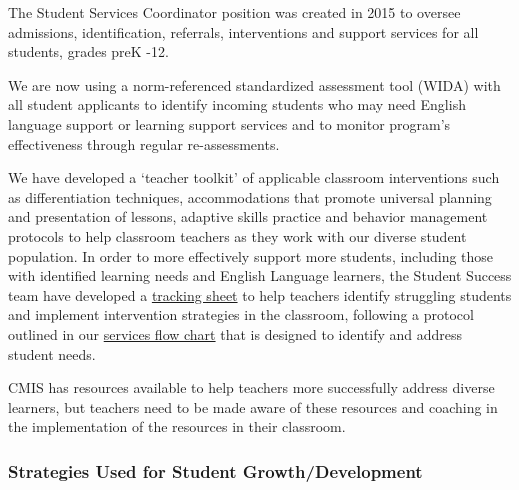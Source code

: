 \begin{findings}
The Student Services Coordinator position was created in 2015 to oversee admissions, identification, referrals, interventions and support services for all students, grades preK -12.

We are now using a norm-referenced standardized assessment tool (WIDA) with all student applicants to identify incoming students who may need English language support or learning support services and to monitor program’s effectiveness through regular re-assessments.
 
We have developed a ‘teacher toolkit’ of applicable classroom interventions such as differentiation techniques, accommodations that promote universal planning and presentation of lessons, adaptive skills practice and behavior management protocols to help classroom teachers as they work with our diverse student population. In order to more effectively support more students, including those with identified learning needs and English Language learners, the Student Success team have developed a \href{https://docs.google.com/spreadsheets/d/16Kq5H0YlZLT2VsB8hPi5RM9Bgs-yFhhX5hK2WfC2Bos/edit#gid=0}{tracking sheet} to help teachers identify struggling students and implement intervention strategies in the classroom, following a protocol outlined in our \href{https://docs.google.com/document/d/1FvbhAOYQPLcjfpqeQcBfziPMPqsBziHEfL_HGnidN_A/edit}{services flow chart} that is designed to identify and address student needs.


CMIS has resources available to help teachers more successfully address diverse learners, but teachers need to be made aware of these resources and coaching in the implementation of the resources in their classroom.
\end{findings}

\subsubsection{Strategies Used for Student Growth/Development}


